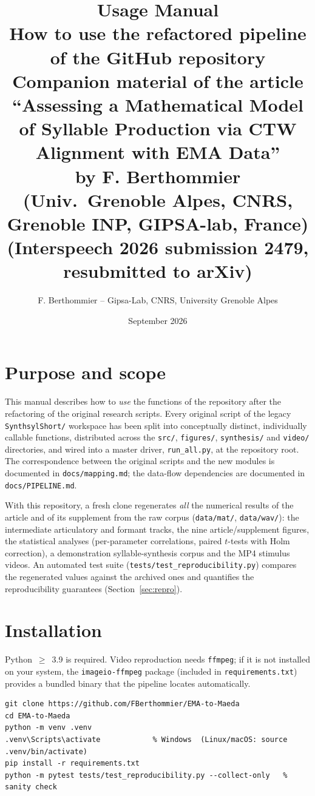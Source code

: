 \documentclass[11pt,a4paper]{article}
\title{\textbf{Usage Manual}\\[4pt]
\large How to use the refactored pipeline of the GitHub repository\\[2pt]
\normalsize Companion material of the article ``Assessing a Mathematical Model
of Syllable Production via CTW Alignment with EMA Data''\\
by F. Berthommier (Univ.\ Grenoble Alpes, CNRS, Grenoble INP, GIPSA-lab, France)\\
(Interspeech 2026 submission 2479, resubmitted to arXiv)}
\author{F. Berthommier -- Gipsa-Lab, CNRS, University Grenoble Alpes}
\date{September 2026}
\begin{document}
\maketitle

\begin{center}
\end{center}

\section{Purpose and scope}
This manual describes how to \emph{use} the functions of the repository
after the refactoring of the original research scripts. Every original
script of the legacy \texttt{SynthsylShort/} workspace has been split into
conceptually distinct, individually callable functions, distributed across
the \texttt{src/}, \texttt{figures/}, \texttt{synthesis/} and
\texttt{video/} directories, and wired into a master driver,
\texttt{run\_all.py}, at the repository root. The correspondence between
the original scripts and the new modules is documented in
\texttt{docs/mapping.md}; the data-flow dependencies are documented in
\texttt{docs/PIPELINE.md}.

With this repository, a fresh clone regenerates \emph{all} the numerical
results of the article and of its supplement from the raw corpus
(\texttt{data/mat/}, \texttt{data/wav/}): the intermediate articulatory
and formant tracks, the nine article/supplement figures, the statistical
analyses (per-parameter correlations, paired $t$-tests with Holm
correction), a demonstration syllable-synthesis corpus and the MP4
stimulus videos. An automated test suite
(\texttt{tests/test\_reproducibility.py}) compares the regenerated values
against the archived ones and quantifies the reproducibility guarantees
(Section~\ref{sec:repro}).

\section{Installation}
Python~$\geq$~3.9 is required. Video reproduction needs \texttt{ffmpeg};
if it is not installed on your system, the \texttt{imageio-ffmpeg} package
(included in \texttt{requirements.txt}) provides a bundled binary that the
pipeline locates automatically.
\begin{lstlisting}
git clone https://github.com/FBerthommier/EMA-to-Maeda
cd EMA-to-Maeda
python -m venv .venv
.venv\Scripts\activate            % Windows  (Linux/macOS: source .venv/bin/activate)
pip install -r requirements.txt
python -m pytest tests/test_reproducibility.py --collect-only   % sanity check
\end{lstlisting}
\end{document}

